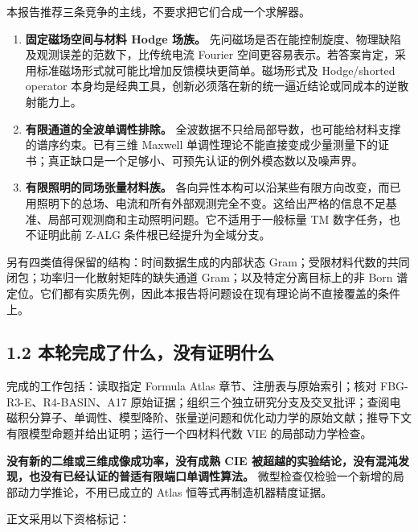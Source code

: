 \documentclass[11pt,a4paper]{article}
\newcommand{\tightlist}{\setlength{\itemsep}{0pt}\setlength{\parskip}{0pt}}
\begin{document}
本报告推荐三条竞争的主线，不要求把它们合成一个求解器。

\begin{enumerate}
\def\labelenumi{\arabic{enumi}.}
\tightlist
\item
  \textbf{固定磁场空间与材料 Hodge 场族。}
  先问磁场是否在能控制旋度、物理缺陷及观测误差的范数下，比传统电流
  Fourier
  空间更容易表示。若答案肯定，采用标准磁场形式就可能比增加反馈模块更简单。磁场形式及
  Hodge/shorted operator
  本身均是经典工具，创新必须落在新的统一逼近结论或同成本的逆散射能力上。
\item
  \textbf{有限通道的全波单调性排除。}
  全波数据不只给局部导数，也可能给材料支撑的谱序约束。已有三维 Maxwell
  单调性理论不能直接变成少量测量下的证书；真正缺口是一个足够小、可预先认证的例外模态数以及噪声界。
\item
  \textbf{有限照明的同场张量材料族。}
  各向异性本构可以沿某些有限方向改变，而已用照明下的总场、电流和所有外部观测完全不变。这给出严格的信息不足基准、局部可观测商和主动照明问题。它不适用于一般标量
  TM 数字任务，也不证明此前 Z-ALG 条件根已经提升为全域分支。
\end{enumerate}

另有四类值得保留的结构：时间数据生成的内部状态
Gram；受限材料代数的共同闭包；功率归一化散射矩阵的缺失通道
Gram；以及特定分离目标上的非 Born
谱定位。它们都有实质先例，因此本报告将问题设在现有理论尚不直接覆盖的条件上。

\hypertarget{ux672cux8f6eux5b8cux6210ux4e86ux4ec0ux4e48ux6ca1ux6709ux8bc1ux660eux4ec0ux4e48}{%
\subsection{1.2
本轮完成了什么，没有证明什么}\label{ux672cux8f6eux5b8cux6210ux4e86ux4ec0ux4e48ux6ca1ux6709ux8bc1ux660eux4ec0ux4e48}}

完成的工作包括：读取指定 Formula Atlas 章节、注册表与原始索引；核对
FBG-R3-E、R4-BASIN、A17
原始证据；组织三个独立研究分支及交叉批评；查阅电磁积分算子、单调性、模型降阶、张量逆问题和优化动力学的原始文献；推导下文有限模型命题并给出证明；运行一个四材料代数
VIE 的局部动力学检查。

\textbf{没有新的二维或三维成像成功率，没有成熟 CIE
被超越的实验结论，没有混沌发现，也没有已经认证的普适有限端口单调性算法。}
微型检查仅检验一个新增的局部动力学推论，不用已成立的 Atlas
恒等式再制造机器精度证据。

正文采用以下资格标记：
\end{document}
